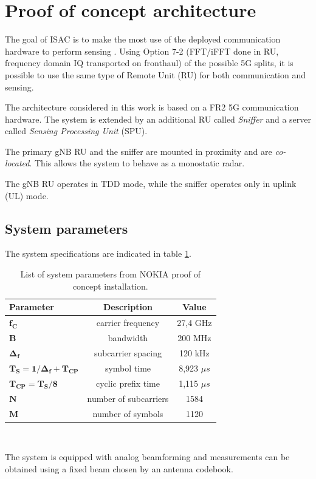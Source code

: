 \section{Proof of concept architecture}
\label{sec:intro-PoCarchitecture}

The goal of ISAC is to make the most use of the deployed communication hardware to perform sensing \cite{Wild_Grudnitsky_Mandelli_Henninger_Guan_Schaich_2023}. Using Option 7-2 (FFT/iFFT done in RU, frequency domain IQ transported on fronthaul) of the possible 5G splits, it is possible to use the same type of Remote Unit (RU) for both communication and sensing.

The architecture considered in this work is based on a FR2 5G communication hardware. The system is extended by an additional RU called \textit{Sniffer} and a server called \textit{Sensing Processing Unit} (SPU).

The primary gNB RU and the sniffer are mounted in proximity and are \textit{co-located}. This allows the system to behave as a monostatic radar.

The gNB RU operates in TDD mode, while the sniffer operates only in uplink (UL) mode.

\subsection{System parameters}

The system specifications are indicated in table \ref{table:PoCparams}.

\begin{table}[H]
	\centering 
	\begin{tabular}{|p{9em} c c |}
		\hline
		\rowcolor{bluepoli!40} %
		\textbf{Parameter} & \textbf{Description} & \textbf{Value}  \T\B \\
		\hline \hline
		$\bm{f_C}$ & carrier frequency & 27,4 GHz \T\B \\
		$\bm{B}$ & bandwidth & 200 MHz \T\B\\
		$\bm{\Delta_f}$ & subcarrier spacing & 120 kHz  \T\B\\
		$\bm{T_S = 1/\Delta_f + T_{CP}}$ & symbol time & 8,923 $\mu s$  \T\B\\
		$\bm{T_{CP} = T_S/8}$ & cyclic prefix time & 1,115 $\mu s$  \T\B\\
		$\bm{N}$ & number of subcarriers & 1584  \T\B\\
		$\bm{M}$ & number of symbols & 1120  \B\\
		
		\hline
	\end{tabular}
	\\[10pt]
	\caption{List of system parameters from NOKIA proof of concept installation.}
	\label{table:PoCparams}
\end{table}

The system is equipped with analog beamforming and measurements can be obtained using a fixed beam chosen by an antenna codebook.
